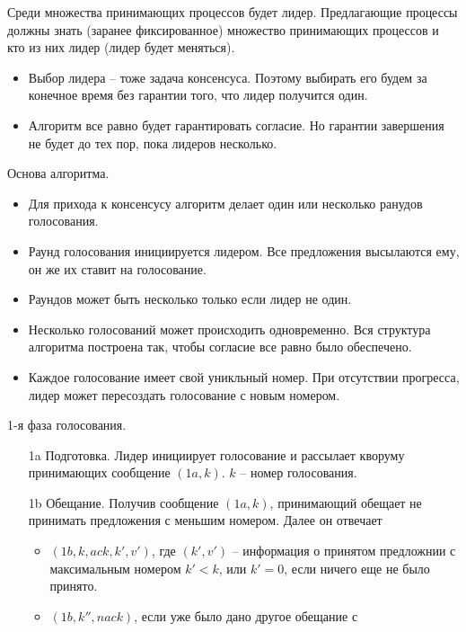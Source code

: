 \begin{algorithm}
\begin{itemize}
    \end{itemize}
    Среди множества принимающих процессов будет лидер. Предлагающие процессы
    должны знать (заранее фиксированное) множество принимающих процессов
    и кто из них лидер (лидер будет меняться).
    \begin{itemize}
        \item Выбор лидера -- тоже задача консенсуса. Поэтому выбирать его
            будем за конечное время без гарантии того, что лидер получится один.
        \item Алгоритм все равно будет гарантировать согласие. Но гарантии завершения
            не будет до тех пор, пока лидеров несколько.
    \end{itemize}
    Основа алгоритма.
    \begin{itemize}
        \item Для прихода к консенсусу алгоритм делает один или несколько
            ранудов голосования.
        \item Раунд голосования инициируется лидером. Все предложения высылаются
            ему, он же их ставит на голосование.
        \item Раундов может быть несколько только если лидер не один.
        \item Несколько голосований может происходить одновременно. Вся структура
            алгоритма построена так, чтобы согласие все равно было обеспечено.
        \item Каждое голосование имеет свой уникльный номер. При отсутствии прогресса,
            лидер может пересоздать голосование с новым номером.
    \end{itemize}
    1-я фаза голосования.
    \begin{itemize}
        \item[1a] Подготовка. Лидер инициирует голосование и рассылает кворуму
            принимающих сообщение $(1a, k)$. $k$ -- номер голосования.
        \item[1b] Обещание. Получив сообщение $(1a, k)$, принимающий обещает
            не принимать предложения с меньшим номером. Далее он отвечает
            \begin{itemize}
                \item $(1b, k, ack, k', v')$, где $(k', v')$ -- информация
                    о принятом предложнии с максимальным номером $k' < k$,
                    или $k' = 0$, если ничего еще не было принято.
                \item $(1b, k'', nack)$, если уже было дано другое обещание с

\end{itemize}
\end{itemize}
\end{algorithm}
